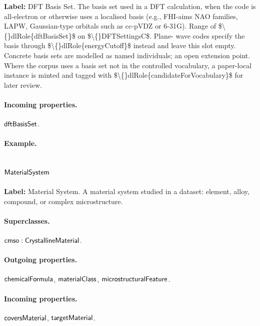 \textbf{Label:} DFT Basis Set.
The basis set used in a DFT calculation, when the code is all-electron or otherwise uses a localised basis (e.g., FHI-aims NAO families, LAPW, Gaussian-type orbitals such as cc-pVDZ or 6-31G). Range of \$\textbackslash\{\}dlRole\{dftBasisSet\}\$ on \$\textbackslash\{\}DFTSettingsC\$. Plane- wave codes specify the basis through \$\textbackslash\{\}dlRole\{energyCutoff\}\$ instead and leave this slot empty. Concrete basis sets are modelled as named individuals; an open extension point. Where the corpus uses a basis set not in the controlled vocabulary, a paper-local instance is minted and tagged with \$\textbackslash\{\}dlRole\{candidateForVocabulary\}\$ for later review.

\paragraph{Incoming properties.} $\mathsf{dftBasisSet}$.

\paragraph{Example.}

\subsection{$\mathsf{MaterialSystem}$}
\label{sec:term-MaterialSystem}

\textbf{Label:} Material System.
A material system studied in a dataset: element, alloy, compound, or complex microstructure.

\paragraph{Superclasses.} $\mathsf{cmso:CrystallineMaterial}$.

\paragraph{Outgoing properties.} $\mathsf{chemicalFormula}$, $\mathsf{materialClass}$, $\mathsf{microstructuralFeature}$.

\paragraph{Incoming properties.} $\mathsf{coversMaterial}$, $\mathsf{targetMaterial}$.

